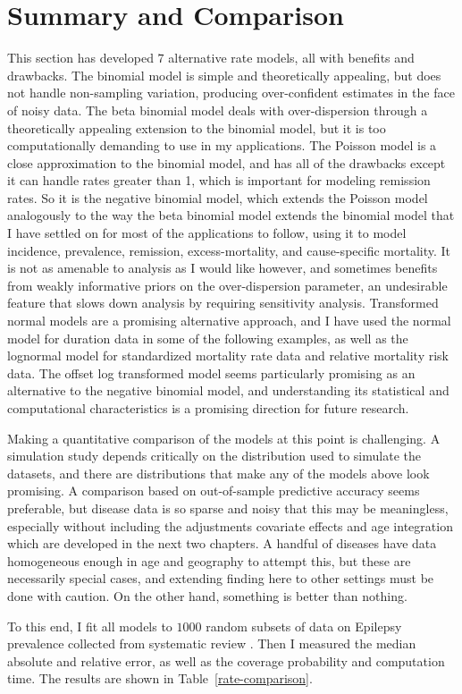 \section{Summary and Comparison}
This section has developed $7$ alternative rate models, all with
benefits and drawbacks.  The binomial model is simple and
theoretically appealing, but does not handle non-sampling variation,
producing over-confident estimates in the face of noisy data.  The
beta binomial model deals with over-dispersion through a theoretically
appealing extension to the binomial model, but it is too
computationally demanding to use in my applications.  The Poisson
model is a close approximation to the binomial model, and has all of
the drawbacks except it can handle rates greater than 1, which is
important for modeling remission rates.  So it is the negative
binomial model, which extends the Poisson model analogously to the way
the beta binomial model extends the binomial model that I have settled
on for most of the applications to follow, using it to model
incidence, prevalence, remission, excess-mortality, and cause-specific
mortality. It is not as amenable to analysis as I would like however,
and sometimes benefits from weakly informative priors on the
over-dispersion parameter, an undesirable feature that slows down
analysis by requiring sensitivity analysis.  Transformed normal models
are a promising alternative approach, and I have used the normal model
for duration data in some of the following examples, as well as the
lognormal model for standardized mortality rate data and relative
mortality risk data. The offset log transformed model seems
particularly promising as an alternative to the negative binomial
model, and understanding its statistical and computational
characteristics is a promising direction for future research.

Making a quantitative comparison of the models at this point is
challenging.  A simulation study depends critically on the
distribution used to simulate the datasets, and there are
distributions that make any of the models above look promising.  A
comparison based on out-of-sample predictive accuracy seems
preferable, but disease data is so sparse and noisy that this may be
meaningless, especially without including the adjustments covariate
effects and age integration which are developed in the next two
chapters.  A handful of diseases have data homogeneous enough in age
and geography to attempt this, but these are necessarily special
cases, and extending finding here to other settings must be done with
caution.  On the other hand, something is better than nothing.

To this end, I fit all models to $1000$ random subsets of data on
Epilepsy prevalence collected from systematic review \cite{TK}.  Then
I measured the median absolute and relative error, as well as the
coverage probability and computation time.  The results are shown in
Table~\ref{rate-comparison}.
